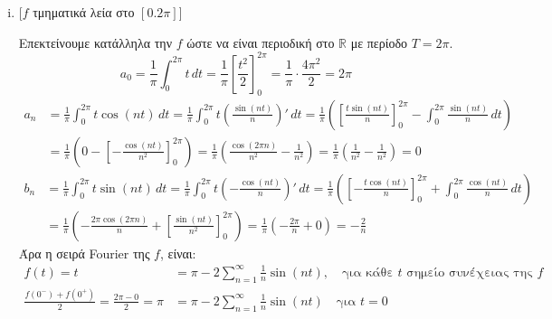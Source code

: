 \begin{solution}
\item {}
  \begin{enumerate}[i)]
    \item 
      \begin{minipage}[t]{0.65\textwidth}
        [$f$ τμηματικά λεία στο $ [0.2 \pi] $]
      \end{minipage}

      Επεκτείνουμε κατάλληλα την $f$ ώστε να είναι περιοδική στο $\mathbb{R}$ 
      με περίοδο $ T=2 \pi $.
      \[
        a_{0} = \frac{1}{\pi} \int _{0}^{2 \pi} t\,{dt} = \frac{1}{\pi}
        \left[\frac{t^{2}}{2}\right]_{0}^{2 \pi} = \frac{1}{\pi} \cdot 
        \frac{4 \pi ^{2}}{2} = 2 \pi
      \] 
      \begin{align*}
        a_{n} &= \frac{1}{\pi} \int _{0}^{2 \pi} t \cos{(nt)} \,{dt} = \frac{1}{\pi} 
        \int _{0}^{2 \pi} t \left(\frac{\sin{(nt)}}{n}\right)' \,{dt} = \frac{1}{\pi}
        \left(\left[\frac{t \sin{(nt)}}{n} \right]_{0}^{2 \pi} - \int _{0}^{2 \pi}
        \frac{\sin{(nt)}}{n} \,{dt}\right) \\ 
              &= \frac{1}{\pi} \left(0 - \left[- \frac{\cos{(nt)}}{n^{2}}\right]_{0}^{2 
                \pi}\right) = \frac{1}{\pi} \left(\frac{\cos{(2 \pi n)}}{n^{2}} - 
                \frac{1}{n^{2}}\right) = \frac{1}{\pi} \left(\frac{1}{n^{2}} - 
              \frac{1}{n^{2}}\right) = 0
      \end{align*} 
      \begin{align*}
        b_{n} &= \frac{1}{\pi} \int _{0}^{2 \pi} t \sin{(nt)} \,{dt} = \frac{1}{\pi} 
        \int _{0}^{2 \pi } t \left(- \frac{\cos{(nt)}}{n}\right)' \,{dt} = \frac{1}{\pi}
        \left(\left[- \frac{t \cos{(nt)}}{n} \right]_{0}^{2 \pi} + \int _{0}^{2 \pi}
        \frac{\cos{(nt)}}{n} \,{dt}\right) \\
              &= \frac{1}{\pi} \left(- \frac{2 \pi \cos{(2 \pi n)}}{n} + \left[
              \frac{\sin{(nt)}}{n^{2}}\right]_{0}^{2 \pi}\right) = 
              \frac{1}{\pi} \left(- \frac{2 \pi}{n} + 0\right) = - \frac{2}{n} 
      \end{align*}
      Άρα η σειρά Fourier της $f$, είναι:
      \begin{align*}
        f(t) = t &= \pi - 2\sum_{n=1}^{\infty} \frac{1}{n} \sin{(nt)} , 
        \quad \text{για κάθε $t$ σημείο συνέχειας της $f$} \\
        \frac{f(0^{-})+f(0^{+})}{2} = \frac{2 \pi - 0 }{2} = \pi 
                 &= \pi - 2\sum_{n=1}^{\infty} \frac{1}{n} \sin{(nt)} 
                 \quad \text{για $t=0$} 
      \end{align*}


\end{enumerate}
\end{solution}
